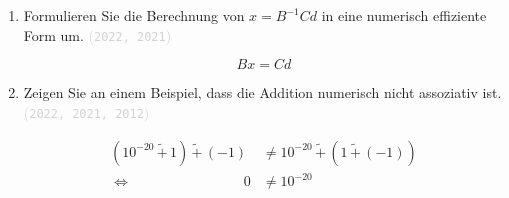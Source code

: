 \documentclass[12pt]{article}
\newcommand{\kommentarMacro}[1]{\textcolor{lightgray}{(\texttt{#1})}}
\newcommand\Cline[2][red]{{\sbox\MBox{$#2$}%
  \rlap{\usebox\MBox}\color{#1}\rule[-1.2\dp\MBox]{\wd\MBox}{0.5pt}}}
\begin{document}
\begin{enumerate}
\begin{solution}
              \begin{align*}
                  \kappa_{\infty}(A) & = \zeilensummennorm{A} \cdot \zeilensummennorm{A^{-1}}                                                                                                                                                                                                                                                                                         \\
                                     & = \max\left\{|a|+|b|,|c|+|d|\right\} \cdot \max\left\{\frac{|d|+|-b|}{|det(A)|},\frac{|-c|+|a|}{|det(A)|}\right\}                                                                                                                                                                                                                              \\
                                     & = \max\left\{\Cline[violet]{\frac{\left(|a|+|b|\right) \cdot \left(|b|+|d|\right)}{|det(A)|}},\Cline[red]{\frac{\left(|a|+|b|\right) \cdot \left(|a|+|c|\right)}{|det(A)|}},\Cline[lime]{\frac{\left(|c|+|d|\right)\cdot\left(|b|+|d|\right)}{|det(A)|}},\Cline[green]{\frac{\left(|c|+|d|\right)\cdot\left(|a|+|c|\right)}{|det(A)|}}\right\}
              \end{align*}

              Durch die Beträge lassen sich die Multiplikationen der $\max -$Funktionen \\ kombinieren. Wie zu erkennen ist, handelt es sich bei beiden Normen um das Gleiche.
          \end{solution}
    \item Formulieren Sie die Berechnung von $x = B^{-1}Cd$ in eine numerisch effiziente Form um. \kommentarMacro{2022, 2021}
          \begin{solution}
              $$Bx = Cd$$
          \end{solution}
    \item Zeigen Sie an einem Beispiel, dass die Addition numerisch nicht assoziativ ist. \\ \kommentarMacro{2022, 2021, 2012}
          \newcommand{\numPlus}{\,\widetilde{+}\,}
          \begin{solution}
              \begin{align*}
                  (10^{-20} \numPlus 1) \numPlus (-1) & \neq 10^{-20} \numPlus (1 \numPlus (-1)) \\
                  \iff \qquad \qquad \qquad \qquad 0  & \neq 10^{-20}
              \end{align*}
          \end{solution}


\end{enumerate}
\end{document}
